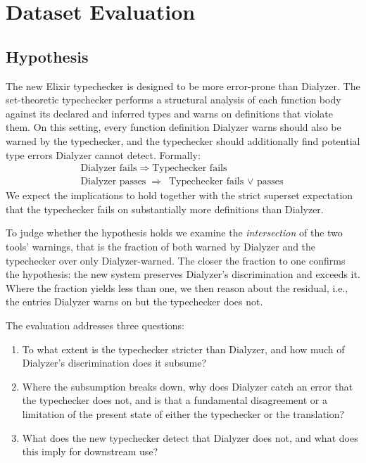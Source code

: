 \section{Dataset Evaluation}
\label{sec:evaluation}

\subsection{Hypothesis}
\label{sec:hypothesis}

The new Elixir typechecker is designed to be more error-prone than Dialyzer.
The set-theoretic typechecker performs a structural analysis of each function body against its declared and inferred types and warns on definitions that violate them.
On this setting, every function definition Dialyzer warns should also be warned by the typechecker, and the typechecker should additionally find potential type errors Dialyzer cannot detect.
Formally:
\begin{gather*}
  \text{Dialyzer fails} \;\Rightarrow\; \text{Typechecker fails} \\
  \text{Dialyzer passes} \;\Rightarrow\; \text{Typechecker fails $\vee$ passes}
\end{gather*}
We expect the implications to hold together with the strict superset expectation that the typechecker fails on substantially more definitions than Dialyzer.

To judge whether the hypothesis holds we examine the \emph{intersection} of the two tools' warnings, that is the fraction of both warned by Dialyzer and the typechecker over only Dialyzer-warned.
The closer the fraction to one confirms the hypothesis: the new system preserves Dialyzer's discrimination and exceeds it.
Where the fraction yields less than one, we then reason about the residual, i.e., the entries Dialyzer warns on but the typechecker does not.

The evaluation addresses three questions:
\begin{enumerate}
    \item To what extent is the typechecker stricter than Dialyzer, and how much of Dialyzer's discrimination does it subsume?
    \item Where the subsumption breaks down, why does Dialyzer catch an error that the typechecker does not, and is that a fundamental disagreement or a limitation of the present state of either the typechecker or the translation?
    \item What does the new typechecker detect that Dialyzer does not, and what does this imply for downstream use?
\end{enumerate}

